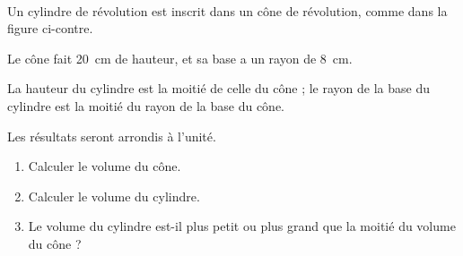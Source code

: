 \documentclass[12pt]{article}
\begin{document}
\begin{exercice}~
  \begin{multicols}{2}
    Un cylindre de révolution est inscrit dans un cône de révolution, comme dans la figure ci-contre.

    Le cône fait 20~cm de hauteur, et sa base a un rayon de 8~cm.

    La hauteur du cylindre est la moitié de celle du cône ; le rayon de la base du cylindre est la moitié du rayon de la base du cône.

    \columnbreak

    \begin{center}
    \end{center}
  \end{multicols}

  Les résultats seront arrondis à l'unité.

  \begin{enumerate}
    \item Calculer le volume du cône.
    \item Calculer le volume du cylindre.
    \item Le volume du cylindre est-il plus petit ou plus grand que la moitié du volume du cône ?
  \end{enumerate}


\end{exercice}
\end{document}

